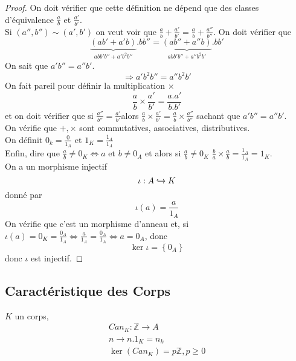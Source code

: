 \documentclass[../main.tex]{subfiles}
\begin{document}
\begin{proof}
On doit vérifier que cette définition ne dépend que des classes d'équivalence $\frac{a}{b}$ et $\frac{a'}{b'}$.\\
Si $ ( a'',b'')\sim ( a',b')$ on veut voir que $\frac{a}{b} + \frac{a'}{b'} = \frac{a}{b} + \frac{a''}{b''}$.
On doit vérifier que 
\[ 
	\underbrace{( ab' + a'b )}_{abb'b'' + a'b^{2}b''}.bb'' = \underbrace{( ab'' + a''b)}_{abb'b'' + a''b^{2}b'}.bb'
\]
On sait que $a'b'' = a''b'$.
\[ 
\Rightarrow a'b^{2}b'' = a''b^{2}b'
\]
On fait pareil pour définir la multiplication $\times$ 
\[ 
\frac{a}{b} \times \frac{a'}{b'} = \frac{a.a'}{b.b'}
\]
et on doit vérifier que si $\frac{a''}{b''} = \frac{a'}{b'}$alors $\frac{a}{b}\times \frac{a'}{b'} = \frac{a}{b} \times \frac{a''}{b''}$ sachant que $a'b'' = a'' b'$.\\
On vérifie que  $+, \times$ sont commutatives, associatives, distributives.\\
On définit $0_k = \frac{0}{1_A}$ et $1_K = \frac{1_A}{1_A}$ \\
Enfin, dire que $\frac{a}{b} \neq 0_K \iff a \text{ et } b \neq 0_A$ et alors si $\frac{a}{b}\neq 0_K$ $\frac{b}{a}\times \frac{a}{b} = \frac{1_A}{1_A}= 1_K$.\\
On a un morphisme injectif
\[ 
\iota: A \hookrightarrow K
\]
donné par 
\[ 
	\iota(a) = \frac{a}{1_A}
\]
On vérifie que c'est un morphisme d'anneau et, si $\iota(a) = 0_K = \frac{0_A}{1_A} \iff \frac{a}{1_A} = \frac{0_A}{1_A} \iff a = 0_A$, donc
\[ 
\ker \iota = \left\{ 0_A \right\} 
\]
donc $\iota$ est injectif.
\end{proof}
\subsection{Caractéristique des Corps}
$K$ un corps,
\begin{align*}
Can_K: \mathbb{Z} \to A\\
n \to n.1_K = n_k\\
\ker(Can_K) = p \mathbb{Z}, p \geq 0
\end{align*}
\end{document}
